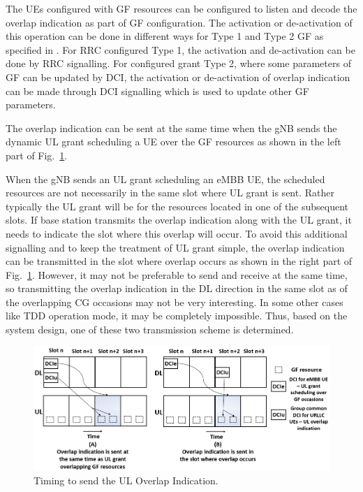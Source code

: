 \documentclass[conference]{IEEEtran}
\begin{document}
The UEs configured with GF resources can be configured to listen and decode the overlap indication as part of GF configuration. The activation or de-activation of this operation can be done in different ways for Type 1 and Type 2 GF as specified in \cite{ad4}. For RRC configured Type 1, the activation and de-activation can be done by RRC signalling. For configured grant Type 2, where some parameters of GF can be updated by DCI, the activation or de-activation of overlap indication can be made through DCI signalling which is used to update other GF parameters.

The overlap indication can be sent at the same time when the gNB sends the dynamic UL grant scheduling a UE over the GF resources as shown in the left part of Fig.~\ref{fig4}.

When the gNB sends an UL grant scheduling an eMBB UE, the scheduled resources are not necessarily in the same slot where UL grant is sent. Rather typically the UL grant will be for the resources located in one of the subsequent slots. If base station transmits the overlap indication along with the UL grant, it needs to indicate the slot where this overlap will occur. To avoid this additional signalling and to keep the treatment of UL grant simple, the overlap indication can be transmitted in the slot where overlap occurs as shown in the right part of Fig.~\ref{fig4}. However, it may not be preferable to send and receive at the same time, so transmitting the overlap indication in the DL direction in the same slot as of the overlapping CG occasions may not be very interesting. In some other cases like TDD operation mode, it may be completely impossible. Thus, based on the system design, one of these two transmission scheme is determined.

\begin{figure}[htbp]
\centerline{\includegraphics[scale=0.24]{fig4.PNG}}
\caption{Timing to send the UL Overlap Indication.}
\label{fig4}
\vspace{-4mm}
\end{figure}
\end{document}
